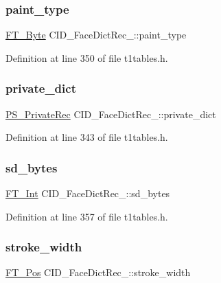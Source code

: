 \subsubsection{\texorpdfstring{paint\_type}{paint\_type}}
{\footnotesize\ttfamily \mbox{\hyperlink{fttypes_8h_a51f26183ca0c9f4af958939648caeccd}{F\+T\+\_\+\+Byte}} C\+I\+D\+\_\+\+Face\+Dict\+Rec\+\_\+\+::paint\+\_\+type}



Definition at line 350 of file t1tables.\+h.

\mbox{\label{struct_c_i_d___face_dict_rec___a6ccc25ba0592648bbb7a4a163fc7fdb0}} 
\subsubsection{\texorpdfstring{private\_dict}{private\_dict}}
{\footnotesize\ttfamily \mbox{\hyperlink{t1tables_8h_afe2ae1e8e05fe5f125ec128d7179a462}{P\+S\+\_\+\+Private\+Rec}} C\+I\+D\+\_\+\+Face\+Dict\+Rec\+\_\+\+::private\+\_\+dict}



Definition at line 343 of file t1tables.\+h.

\mbox{\label{struct_c_i_d___face_dict_rec___aecdf98f9671f22c1715ec929b77767ce}} 
\subsubsection{\texorpdfstring{sd\_bytes}{sd\_bytes}}
{\footnotesize\ttfamily \mbox{\hyperlink{fttypes_8h_af90e5fb0d07e21be9fe6faa33f02484c}{F\+T\+\_\+\+Int}} C\+I\+D\+\_\+\+Face\+Dict\+Rec\+\_\+\+::sd\+\_\+bytes}



Definition at line 357 of file t1tables.\+h.

\mbox{\label{struct_c_i_d___face_dict_rec___a7da1ebfa4a184b696f789c27c07f23d1}} 
\subsubsection{\texorpdfstring{stroke\_width}{stroke\_width}}
{\footnotesize\ttfamily \mbox{\hyperlink{ftimage_8h_af5f230f4b253d4c7715fd2e595614c90}{F\+T\+\_\+\+Pos}} C\+I\+D\+\_\+\+Face\+Dict\+Rec\+\_\+\+::stroke\+\_\+width}



